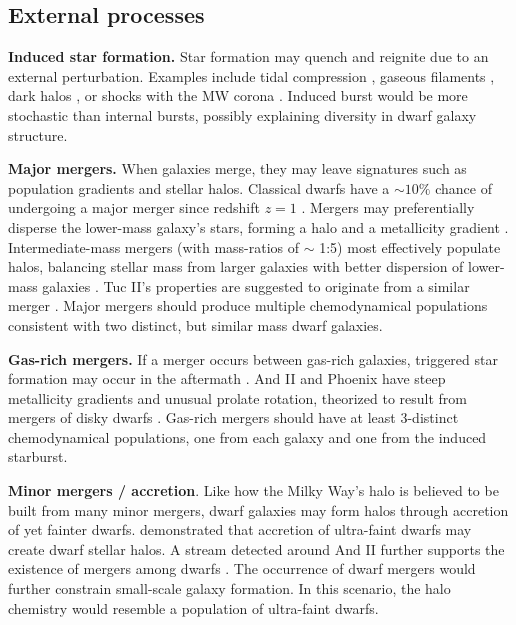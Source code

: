 \subsection{External processes}\label{external-processes}

\textbf{Induced star formation.} Star formation may quench and reignite
due to an external perturbation. Examples include tidal compression
\citep{mayer+2001a, dong+lin+murray2003}, gaseous filaments
\citep{genina+2019}, dark halos \citep{starkenburg+helmi+sales2016}, or
shocks with the MW corona \citep{wright+2019}. Induced burst would be
more stochastic than internal bursts, possibly explaining diversity in
dwarf galaxy structure.

\textbf{Major mergers.} When galaxies merge, they may leave signatures
such as population gradients and stellar halos. Classical dwarfs have a
\(\sim 10\%\) chance of undergoing a major merger since redshift \(z=1\)
\citep{deason+wetzel+garrison-kimmel2014}. Mergers may preferentially
disperse the lower-mass galaxy's stars, forming a halo and a metallicity
gradient \citep{benitez-llambay+2016}. Intermediate-mass mergers (with
mass-ratios of \(\sim\) 1:5) most effectively populate halos, balancing
stellar mass from larger galaxies with better dispersion of lower-mass
galaxies \citep{deason+2022}. Tuc II's properties are suggested to
originate from a similar merger
\citep{tarumi+yoshida+frebel2021, querci+2025}. Major mergers should
produce multiple chemodynamical populations consistent with two
distinct, but similar mass dwarf galaxies.

\textbf{Gas-rich mergers.} If a merger occurs between gas-rich galaxies,
triggered star formation may occur in the aftermath
\citep[e.g.,][]{genina+2019}. And II and Phoenix have steep metallicity
gradients and unusual prolate rotation, theorized to result from mergers
of disky dwarfs \citep{lokas+2014, fouquet+2017, cardona-barrero+2021}.
Gas-rich mergers should have at least 3-distinct chemodynamical
populations, one from each galaxy and one from the induced starburst.

\textbf{Minor mergers / accretion}. Like how the Milky Way's halo is
believed to be built from many minor mergers, dwarf galaxies may form
halos through accretion of yet fainter dwarfs.
\citet{ricotti+polisensky+cleland2022} demonstrated that accretion of
ultra-faint dwarfs may create dwarf stellar halos. A stream detected
around And II further supports the existence of mergers among dwarfs
\citep{amorisco+evans+vandeven2014, roederer+2023}. The occurrence of
dwarf mergers would further constrain small-scale galaxy formation. In
this scenario, the halo chemistry would resemble a population of
ultra-faint dwarfs.

